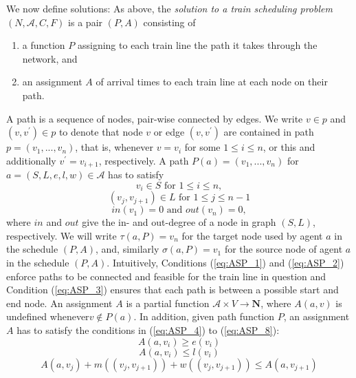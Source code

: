 \documentclass{article}
\begin{document}
We now define solutions:
As above, the \emph{solution to a train scheduling problem} $(N, \mathcal{A}, C, F)$ is a pair $(P,A)$ consisting of
\begin{enumerate}
    \item a function $P$ assigning to each train line the path it takes through the network, and
    \item an assignment $A$ of arrival times to each train line at each node on their path.
\end{enumerate}
A path is a sequence of nodes, pair-wise connected by edges. We write $v\in p$ and $(v, v^\prime)\in p$ to denote that node $v$ or edge $(v, v^\prime)$ are contained in path $p=(v_1, . . . , v_n)$, that is, whenever $v=v_i$ for some $1\leq i \leq n$, or this and additionally $v^\prime=v_{i+1}$, respectively.
%
A path $P(a) = (v_1, . . . , v_n)$ for $a= (S, L, e, l, w)\in \mathcal{A}$ has to satisfy
\begin{equation}
v_i \in S \textrm{ for }1\leq i \leq n \label{eq:ASP_1},
\end{equation}
\begin{equation}
(v_j, v_{j+1})\in L \textrm{ for } 1\leq j \leq n-1 \label{eq:ASP_2}
\end{equation}
\begin{equation}
in(v_1) = 0 \textrm{ and } out(v_n) = 0,\label{eq:ASP_3}
\end{equation}
where $in$ and $out$ give the in- and out-degree of a node in graph $(S, L)$, respectively.
We will write $\tau(a,P)=v_n$ for the target node used by agent $a$ in the schedule $(P,A)$, and, similarly $\sigma(a,P)=v_1$ for the source node of agent $a$ in the schedule $(P,A)$.
Intuitively, Conditions (\ref{eq:ASP_1}) and (\ref{eq:ASP_2}) enforce paths to be connected and feasible for the train line in question and Condition (\ref{eq:ASP_3}) ensures that each path is between a possible start and end node.
An assignment $A$ is a partial function $\mathcal{A}\times V\to \mathbf{N}$, where $A(a, v)$ is undefined whenever$v\not\in P(a)$. In addition, given path function $P$, an assignment $A$ has to satisfy the conditions in (\ref{eq:ASP_4}) to (\ref{eq:ASP_8}):
\begin{equation}
A(a, v_i)\geq e(v_i)\label{eq:ASP_4}
\end{equation}
\begin{equation}
A(a, v_i)\leq l(v_i)\label{eq:ASP_5}
\end{equation}
\begin{equation}
A(a, v_j) +m((v_j, v_{j+1})) +w((v_j, v_{j+1}))\leq A(a, v_{j+1})\label{eq:ASP_6}
\end{equation}
\end{document}
